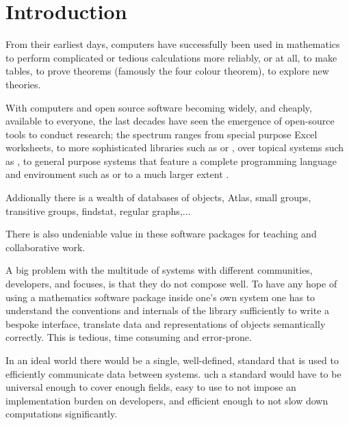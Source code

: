 

\section{Introduction}

From their earliest days, computers have successfully been used in mathematics
to perform complicated or tedious calculations more reliably, or at all, to make
tables, to prove theorems (famously the four colour theorem), to explore new
theories.

With computers and open source software becoming widely, and cheaply, available
to everyone, the last decades have seen the emergence of open-source tools to
conduct research; the spectrum ranges from special purpose Excel worksheets,
to more sophisticated libraries such as \MPIR or \Linbox, over topical systems
such as \Singular, to general purpose systems that feature a complete
programming language and environment such as \GAP or to a much larger extent
\Sage.

Addionally there is a wealth of databases of objects, Atlas, small groups,
transitive groups, findstat, regular graphs,...

There is also undeniable value in these software packages for teaching and
collaborative work.

A big problem with the multitude of systems with different communities,
developers, and focuses, is that they do not compose well. To have any hope of
using a mathematics software package inside one's own system one has to
understand the conventions and internals of the library sufficiently to write a
bespoke interface, translate data and representations of objects semantically
correctly.
This is tedious, time consuming and error-prone.

In an ideal world there would be a single, well-defined, standard that is used
to efficiently communicate data between systems.
uch a standard would have to be universal enough to cover enough fields,
easy to use to not impose an implementation burden on developers,
and efficient enough to not slow down computations significantly.


